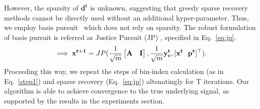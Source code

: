  However, the sparsity of $\mathbf{d^t}$ is unknown, suggesting that greedy sparse recovery methods cannot be directly used without an additional hyper-parameter. Thus, we employ basis pursuit~\cite{candes2006compressive} which does not rely on sparsity. The robust formulation of basis pursuit is referred as Justice Pursuit (JP) \cite{Laska2009}, specified in Eq.~\ref{eq:jp}.
\begin{equation}
\implies \mathbf{{x^{t+1}}} = JP(\frac{1}{\sqrt{m}}\begin{bmatrix} \mathbf{A} & \mathbf{I} \end{bmatrix},\frac{1}{\sqrt{m}}\mathbf{y^t_c},[\mathbf{x^t~~p^t}]^\t).
\label{eq:jp}
\end{equation}
Proceeding this way, we repeat the steps of bin-index calculation (as in Eq.~\ref{step1}) and sparse recovery (Eq.~\ref{eq:jp}) altenatingly for $\mathrm{T}$ iterations. Our algorithm is able to achieve convergence to the true underlying signal, as supported by the results in the experiments section.



%
